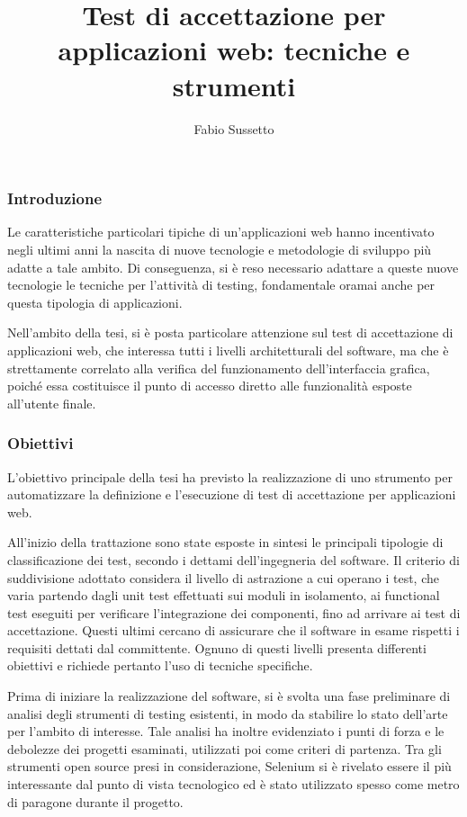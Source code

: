 \documentclass[a4paper,12pt]{article}
\title{Test di accettazione per applicazioni web: \newline tecniche e strumenti}
\author{Fabio Sussetto}
\date{}
\begin{document}
\maketitle

\subsubsection*{Introduzione}

Le caratteristiche particolari tipiche di un'applicazioni web hanno incentivato negli ultimi anni la nascita di nuove tecnologie e metodologie di sviluppo più adatte a tale ambito. Di conseguenza, si è reso necessario adattare a queste nuove tecnologie le tecniche per l'attività di testing, fondamentale oramai anche per questa tipologia di applicazioni.

Nell'ambito della tesi, si è posta particolare attenzione sul test di accettazione di applicazioni web, che interessa tutti i livelli architetturali del software, ma che è strettamente correlato alla verifica del funzionamento dell'interfaccia grafica, poiché essa costituisce il punto di accesso diretto alle funzionalità esposte all'utente finale.

\subsubsection*{Obiettivi}

L'obiettivo principale della tesi ha previsto la realizzazione di uno strumento per automatizzare la definizione e l'esecuzione di test di accettazione per applicazioni web. 

All'inizio della trattazione sono state esposte in sintesi le principali tipologie di classificazione dei test, secondo i dettami dell'ingegneria del software. Il criterio di suddivisione adottato considera il livello di astrazione a cui operano i test, che varia partendo dagli unit test effettuati sui moduli in isolamento, ai functional test eseguiti per verificare l'integrazione dei componenti, fino ad arrivare ai test di accettazione. Questi ultimi cercano di assicurare che il software in esame rispetti i requisiti dettati dal committente. Ognuno di questi livelli presenta differenti obiettivi e richiede pertanto l'uso di tecniche specifiche.  

Prima di iniziare la realizzazione del software, si è svolta una fase preliminare di analisi degli strumenti di testing esistenti, in modo da stabilire lo stato dell'arte per l'ambito di interesse. Tale analisi ha inoltre evidenziato i punti di forza e le debolezze dei progetti esaminati, utilizzati poi come criteri di partenza. Tra gli strumenti open source presi in considerazione, Selenium si è rivelato essere il più interessante dal punto di vista tecnologico ed è stato utilizzato spesso come metro di paragone durante il progetto.
\end{document}
